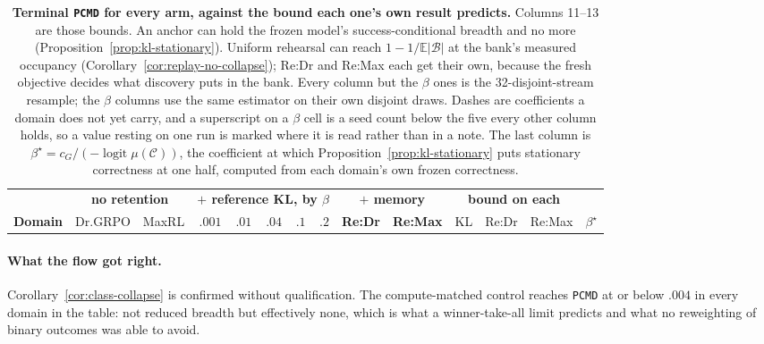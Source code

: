 \documentclass{article}
\newcommand{\1}{\mathbf 1}
\newcommand{\E}{\mathbb E}
\newcommand{\pmd}{\texttt{PCMD}}
\theoremstyle{remark}
\theoremstyle{definition}
\theoremstyle{plain}
\begin{document}
\begin{table}[t]
  \centering
  \caption{\textbf{Terminal \pmd{} for every arm, against the bound each one's
  own result predicts.} Columns 11--13 are those bounds. An anchor can
  hold the frozen model's success-conditional breadth and no more
  (Proposition~\ref{prop:kl-stationary}). Uniform rehearsal can reach
  $1-1/\E|\mathcal B|$ at the bank's measured occupancy
  (Corollary~\ref{cor:replay-no-collapse}); Re:Dr and Re:Max each get their own,
  because the fresh objective decides what discovery puts in the bank. Every
  column but the $\beta$ ones is the 32-disjoint-stream resample; the $\beta$
  columns use the same estimator on their own disjoint draws. Dashes are
  coefficients a domain does not yet carry, and a superscript on a $\beta$ cell
  is a seed count below the five every other column holds, so a value resting
  on one run is marked where it is read rather than in a note. The last column
  is $\beta^\star=c_G/(-\operatorname{logit}\mu(\mathcal C))$, the coefficient
  at which Proposition~\ref{prop:kl-stationary} puts stationary correctness at
  one half, computed from each domain's own frozen correctness.}
  \label{tab:reference-kl-measured}
  \scriptsize
  \setlength{\tabcolsep}{2.9pt}
  \begin{tabular}{@{}lrrrrrrrrrrrrr@{}}
    \toprule
    & \multicolumn{2}{c}{\textbf{no retention}}
      & \multicolumn{5}{c}{\textbf{$+$ reference KL, by $\beta$}}
      & \multicolumn{2}{c}{\textbf{$+$ memory}}
      & \multicolumn{3}{c}{\textbf{bound on each}} & \\
    \cmidrule(lr){2-3}\cmidrule(lr){4-8}\cmidrule(lr){9-10}\cmidrule(lr){11-13}
    \textbf{Domain} & Dr.GRPO & MaxRL
      & $.001$ & $.01$ & $.04$ & $.1$ & $.2$
      & \textbf{Re:Dr} & \textbf{Re:Max}
      & KL & Re:Dr & Re:Max & $\beta^\star$ \\
    \midrule
    
  \end{tabular}
\end{table}

\paragraph{What the flow got right.}
Corollary~\ref{cor:class-collapse} is confirmed without qualification. The
compute-matched control reaches \pmd{} at or below $.004$ in every domain in
the table: not reduced breadth but effectively none, which is what a
winner-take-all limit predicts and what no reweighting of binary outcomes was
able to avoid.
\end{document}
